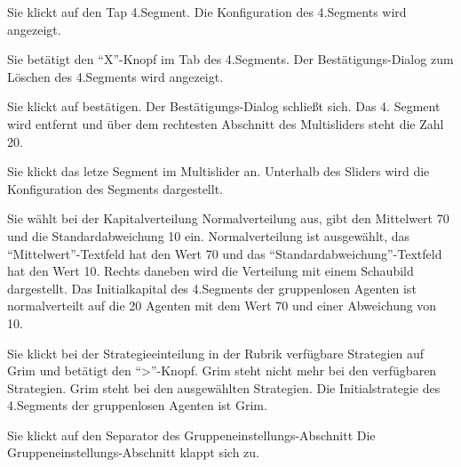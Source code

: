 \documentclass[parskip=full,11pt]{scrartcl}
\begin{document}
{Sie klickt auf den Tap 4.Segment.}
{Die Konfiguration des 4.Segments wird angezeigt.}

{Sie betätigt den \enquote{X}-Knopf im Tab des 4.Segments.}
{Der Bestätigungs-Dialog zum Löschen des 4.Segments wird angezeigt.}

{Sie klickt auf bestätigen.}
{Der Bestätigungs-Dialog schließt sich. Das 4. Segment wird entfernt und über dem rechtesten Abschnitt des Multisliders steht die Zahl 20.}

{Sie klickt das letze Segment im Multislider an.}
{Unterhalb des Sliders wird die Konfiguration des Segments dargestellt.}

{Sie wählt bei der Kapitalverteilung Normalverteilung aus, gibt den Mittelwert 70 und die Standardabweichung 10 ein.}
{Normalverteilung ist ausgewählt, das \enquote{Mittelwert}-Textfeld hat den Wert 70 und das \enquote{Standardabweichung}-Textfeld hat den Wert 10. Rechts daneben wird die Verteilung mit einem Schaubild dargestellt. Das Initialkapital des 4.Segments der gruppenlosen Agenten ist normalverteilt auf die 20 Agenten mit dem Wert 70 und einer Abweichung von 10.}

{Sie klickt bei der Strategieeinteilung in der Rubrik verfügbare Strategien auf Grim und betätigt den \enquote{>}-Knopf.}
{Grim steht nicht mehr bei den verfügbaren Strategien. Grim steht bei den ausgewählten Strategien. Die Initialstrategie des 4.Segments der gruppenlosen Agenten ist Grim.}

{Sie klickt auf den Separator des Gruppeneinstellungs-Abschnitt}
{Die Gruppeneinstellungs-Abschnitt klappt sich zu.}
\end{document}
